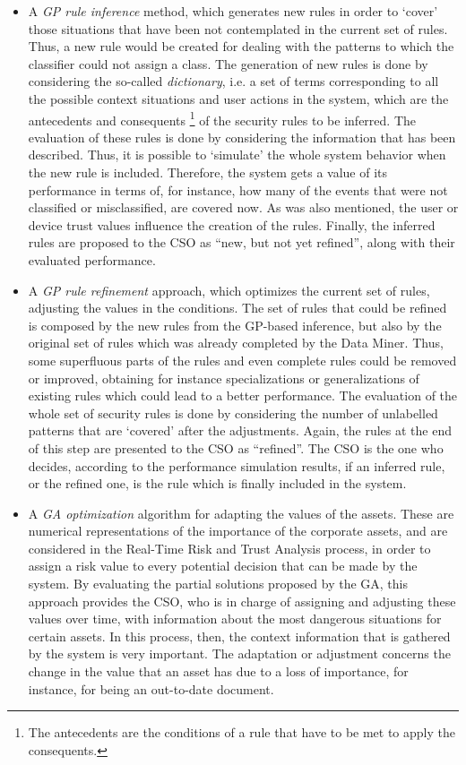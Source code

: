 \begin{itemize}

\item A \textit{GP rule inference} method, which generates new rules in order to `cover' those situations that have been not contemplated in the current set of rules. Thus, a new rule would be created for dealing with the patterns to which the classifier could not assign a class.
The generation of new rules is done by considering the so-called \textit{dictionary}, i.e. a set of terms corresponding to all the possible context situations and user actions in the system, which are the antecedents and consequents \footnote{The antecedents are the conditions of a rule that have to be met to apply the consequents.} of the security rules to be inferred.
The evaluation of these rules is done by considering the information that has been described. Thus, it is possible to `simulate' the whole system behavior when the new rule is included. Therefore, the system gets a value of its performance in terms of, for instance, how many of the events that were not classified or misclassified, are covered now. As was also mentioned, the user or device trust values influence the creation of the rules.
Finally, the inferred rules are proposed to the CSO as ``new, but not yet refined'', along with their evaluated performance.

\item A \textit{GP rule refinement} approach, which optimizes the current set of rules, adjusting the values in the conditions. The set of rules that could be refined is composed by the new rules from the GP-based inference, but also by the original set of rules which was already completed by the Data Miner. Thus, some superfluous parts of the rules and even complete rules could be removed or improved, obtaining for instance specializations or generalizations of existing rules which could lead to a better performance. The evaluation of the whole set of security rules is done by considering the number of unlabelled patterns that are `covered' after the adjustments. Again, the rules at the end of this step are presented to the CSO as ``refined''. The CSO is the one who decides, according to the performance simulation results, if an inferred rule, or the refined one, is the rule which is finally included in the system.

\item A \textit{GA optimization} algorithm for adapting the values of the assets. These are numerical representations of the importance of the corporate assets, and are considered in the Real-Time Risk and Trust Analysis process, in order to assign a risk value to every potential decision that can be made by the system.
By evaluating the partial solutions proposed by the GA, this approach provides the CSO, who is in charge of assigning and adjusting these values over time, with information about the most dangerous situations for certain assets. In this process, then, the context information that is gathered by the system is very important. The adaptation or adjustment concerns the change in the value that an asset has due to a loss of importance, for instance, for being an out-to-date document.

\end{itemize}

